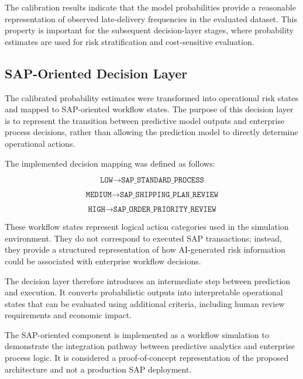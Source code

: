 \documentclass[manuscript, screen, review]{acmart}
\begin{document}
The calibration results indicate that the model probabilities provide a
reasonable representation of observed late-delivery frequencies in the
evaluated dataset. This property is important for the subsequent
decision-layer stages, where probability estimates are used for risk
stratification and cost-sensitive evaluation.

\begin{table}[htbp]
\centering
\caption{Probability Calibration Results}
\label{tab:calibration}

\end{table}


\subsection{SAP-Oriented Decision Layer}

The calibrated probability estimates were transformed into operational
risk states and mapped to SAP-oriented workflow states. The purpose of
this decision layer is to represent the transition between predictive
model outputs and enterprise process decisions, rather than allowing
the prediction model to directly determine operational actions.

The implemented decision mapping was defined as follows:

\[
\texttt{LOW}
\rightarrow
\texttt{SAP\_STANDARD\_PROCESS}
\]

\[
\texttt{MEDIUM}
\rightarrow
\texttt{SAP\_SHIPPING\_PLAN\_REVIEW}
\]

\[
\texttt{HIGH}
\rightarrow
\texttt{SAP\_ORDER\_PRIORITY\_REVIEW}
\]

These workflow states represent logical action categories used in the
simulation environment. They do not correspond to executed SAP
transactions; instead, they provide a structured representation of how
AI-generated risk information could be associated with enterprise
workflow decisions.

The decision layer therefore introduces an intermediate step between
prediction and execution. It converts probabilistic outputs into
interpretable operational states that can be evaluated using additional
criteria, including human review requirements and economic impact.

The SAP-oriented component is implemented as a workflow simulation to
demonstrate the integration pathway between predictive analytics and
enterprise process logic. It is considered a proof-of-concept
representation of the proposed architecture and not a production SAP
deployment.
\end{document}
